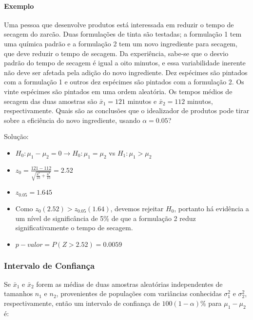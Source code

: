 \documentclass[
]{book}
\providecommand{\tightlist}{%
  \setlength{\itemsep}{0pt}\setlength{\parskip}{0pt}}
\begin{document}
\hypertarget{exemplo-9}{%
\paragraph{Exemplo}\label{exemplo-9}}

Uma pessoa que desenvolve produtos está interessada em reduzir o tempo de secagem do zarcão. Duas formulações de tinta são testadas; a formulação 1 tem uma química padrão e a formulação 2 tem um novo ingrediente para secagem, que deve reduzir o tempo de secagem. Da experiência, sabe-se que o desvio padrão do tempo de secagem é igual a oito minutos, e essa variabilidade inerente não deve ser afetada pela adição do novo ingrediente. Dez espécimes são pintados com a formulação 1 e outros dez espécimes são pintados com a formulação 2. Os vinte espécimes são pintados em uma ordem aleatória. Os tempos médios de secagem das duas amostras são \(\bar x_1=121\) minutos e \(\bar x_2=112\) minutos, respectivamente. Quais são as conclusões que o idealizador de produtos pode tirar sobre a eficiência do novo ingrediente, usando \(\alpha=0.05\)?

Solução:

\begin{itemize}
\tightlist
\item
  \(H_0: \mu_1-\mu_2=0\rightarrow H_0: \mu_1=\mu_2\) vs \(H_1: \mu_1>\mu_2\)
\item
  \(z_0=\frac{121-112}{\sqrt{\frac{8^2}{10}+\frac{8^2}{10}}}=2.52\)
\item
  \(z_{0.05}=1.645\)
\item
  Como \(z_0(2.52)>z_{0.05}(1.64)\), devemos rejeitar \(H_0\), portanto há evidência a um nível de significância de 5\% de que a formulação 2 reduz significativamente o tempo de secagem.
\item
  \(p-valor=P(Z>2.52)=0.0059\)
\end{itemize}

\hypertarget{intervalo-de-confianuxe7a-1}{%
\subsubsection{Intervalo de Confiança}\label{intervalo-de-confianuxe7a-1}}

Se \(\bar x_1\) e \(\bar x_2\) forem as médias de duas amostras aleatórias independentes de tamanhos \(n_1\) e \(n_2\), provenientes de populações com variâncias conhecidas \(\sigma_1^2\) e \(\sigma_2^2\), respectivamente, então um intervalo de confiança de \(100(1-\alpha)\%\) para \(\mu_1-\mu_2\) é:
\end{document}
